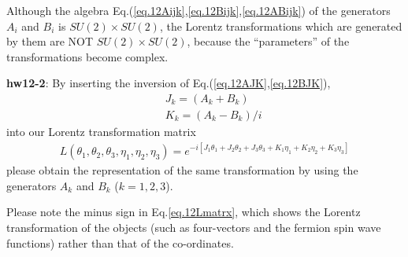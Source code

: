 \documentclass[12pt]{article}
\begin{document}
  Although the algebra Eq.(\ref{eq.12Aijk},\ref{eq.12Bijk},\ref{eq.12ABijk}) of the generators $A_i$ and $B_i$ is
  $SU(2) \times SU(2)$, the Lorentz transformations which are generated
  by them are NOT $SU(2) \times SU(2)$, because the ``parameters'' of
  the transformations become complex.

{\bf hw12-2}: By inserting the inversion of Eq.(\ref{eq.12AJK},\ref{eq.12BJK}),
\begin{eqnarray}
    && J_k = (A_k + B_k) \\
    && K_k = (A_k - B_k)/i
\end{eqnarray}
  into our Lorentz transformation matrix
\begin{eqnarray}
    L(\theta_1, \theta_2, \theta_3, \eta_1, \eta_2, \eta_3)
  = e^{-i[ J_1\theta_1 +J_2\theta_2 +J_3\theta_3 +K_1 \eta_1 +K_2 \eta_2 +K_3 \eta_3 ]} \label{eq.12Lmatrx}
\end{eqnarray}
  please obtain the representation of the same transformation by
  using the generators $A_k$ and $B_k$ ($k=1,2,3$).

  Please note the minus sign in Eq.\ref{eq.12Lmatrx}, which shows the Lorentz
  transformation of the objects (such as four-vectors and the fermion
  spin wave functions) rather than that of the co-ordinates.
\end{document}
